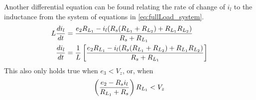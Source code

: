 \pagebreak
Another differential equation can be found relating the rate of change of $i_l$ to the inductance from the system of equations in \eqref{eq:fullLoad_system}.
\begin{equation}
	\begin{split}
		L\frac{di_l}{dt} &= \frac{e_2R_{L_1} - i_l(R_s(R_{L_1}+R_{L_2}) + R_{L_1}R_{L_2})}{R_s + R_{L_1}} \\
		 \frac{di_l}{dt} &= \frac{1}{L} \left[\frac{e_2R_{L_1} - i_l(R_s(R_{L_1}+R_{L_2}) + R_{L_1}R_{L_2})}{R_s + R_{L_1}} \right]
	\end{split}
	\label{eq:fullLoad_DiffEq2}
\end{equation}
This also only holds true when $e_3 < V_z$, or, when
\begin{equation}
	\left(\frac{e_2 - R_s i_l}{R_{L_1} + R_s} \right)R_{L_1} < V_z
\end{equation}

